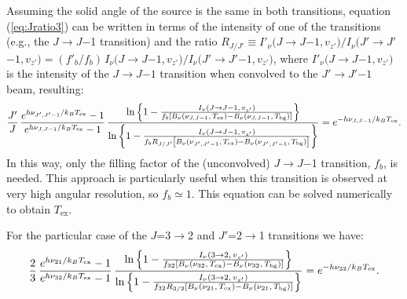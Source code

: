 \documentclass[12pt]{mythesis}
\begin{document}
Assuming the solid angle of the source is the same in both transitions, equation (\ref{eq:Jratio3}) can be written in terms of the intensity of one of the transitions (e.g., the $J$$\rightarrow$$J$$-$1 transition) and the ratio $R_{J/J'} \equiv I'_\nu($$J$$\rightarrow$$J$$-$$1,v_{z'})/I_\nu($$J'$$\rightarrow$$J'$$-$$1,v_{z'}) = (f'_b/f_b)\, I_\nu($$J$$\rightarrow$$J$$-$$1,v_{z'})/I_\nu($$J'$$\rightarrow$$J'$$-$$1,v_{z'})$, where $I'_\nu($$J$$\rightarrow$$J$$-$$1,v_{z'})$ is the intensity of the $J$$\rightarrow$$J$$-$$1$ transition when convolved to the $J'$$\rightarrow$$J'$$-$$1$ beam, resulting:
\begin{equation}
 \frac{J'} {J} \, 
 \frac{e^{h\nu_{J',J'-1}/k_B T_\mathrm{ex}}-1} {e^{h\nu_{J,J-1}/k_B T_\mathrm{ex}}-1} \, 
 \frac{\ln{\left\{1- \frac{I_\nu(J\rightarrow J-1,\, v_{z'})}
{f_b \left[B_\nu(\nu_{J,J-1},\, T_\mathrm{ex})-B_\nu(\nu_{J,J-1},\, T_{\rm bg})\right]} \right\}}}
 {\ln{\left\{1- \frac{I_\nu(J\rightarrow J-1,\, v_{z'})}
{f_b R_{J/J'} \left[B_\nu(\nu_{J',J'-1}, \, T_\mathrm{ex})-B_\nu(\nu_{J',J'-1}, \, T_{\rm bg})\right]} \right\}}}
= e^{-h \nu_{J,J-1}/k_B T_\mathrm{ex}}.
\label{eq:Jratio4}
\end{equation}
 In this way, only the filling factor of the (unconvolved) $J$$\rightarrow$$J$$-$1 transition, $f_b$, is needed. This approach is particularly useful when this transition is observed at very high angular resolution, so $f_b \simeq 1$. This equation can be solved numerically to obtain $T_\mathrm{ex}$.

For the particular case of the $J$=3$\rightarrow$2 and $J'$=2$\rightarrow$1 transitions we have:
\begin{equation}
 \frac{2} {3} \, 
 \frac{e^{h\nu_{21}/k_B T_\mathrm{ex}}-1} {e^{h\nu_{32}/k_B T_\mathrm{ex}}-1} \, 
 \frac{
\ln{\left\{1- \frac{I_\nu(3\rightarrow2, \, v_{z'})}{f_{32} 
\left[B_\nu(\nu_{32}, \, T_\mathrm{ex}) - B_\nu(\nu_{32}, \, T_{\rm bg})\right]} \right\}}}
{\ln{\left\{1- \frac{I_\nu(3\rightarrow2, \, v_{z'})}{f_{32}
R_{3/2} 
\left[B_\nu(\nu_{21}, \, T_\mathrm{ex}) - B_\nu(\nu_{21}, \, T_{\rm bg})\right]} \right\}}}
 = e^{-h \nu_{32}/k_B T_\mathrm{ex}}.
\label{eq:Jratio5}
\end{equation}
\end{document}
